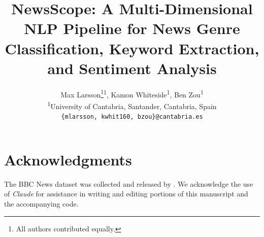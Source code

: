 \documentclass[10pt,twocolumn,letterpaper]{article}
\title{NewsScope: A Multi-Dimensional NLP Pipeline for News Genre Classification,
       Keyword Extraction, and Sentiment Analysis}
\author{%
Max Larsson\thanks{All authors contributed equally.}\textsuperscript{1},\;
Kamon Whiteside\footnotemark[1]\textsuperscript{1},\;
Ben Zou\footnotemark[1]\textsuperscript{1}\\[4pt]
{\small
\textsuperscript{1}University of Cantabria, Santander, Cantabria, Spain}\\
{\tt\small \{mlarsson, kwhit160, bzou\}@cantabria.es}
}
\begin{document}
\maketitle









\section*{Acknowledgments}
The BBC News dataset was collected and released by \citet{greene2006practical}.
We acknowledge the use of \textit{Claude} for assistance in writing and
editing portions of this manuscript and the accompanying code.

{
    \small
    
    
}
\end{document}
